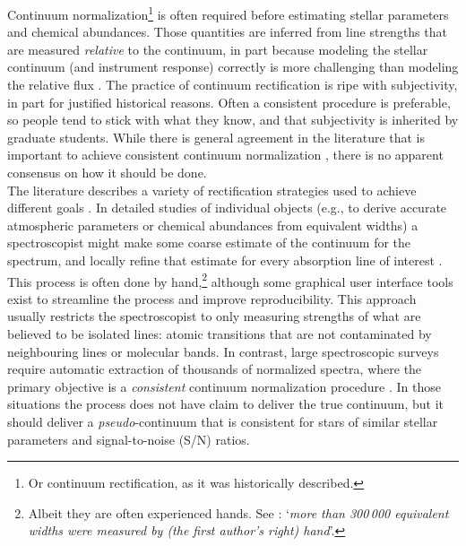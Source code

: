 \documentclass[modern,linenumbers]{aastex631}
\renewcommand{\added}[1]{#1}
\newcommand{\removed}[1]{}
\begin{document}
Continuum normalization\footnote{Or continuum rectification, as it was historically described.} is often required before estimating stellar parameters and chemical abundances. Those quantities are inferred from line strengths that are measured \emph{relative} to the continuum, in part because modeling the stellar continuum (and instrument response) correctly is more challenging than modeling the relative flux \citep[e.g.,][]{Wheeler:2023, Wheeler:2024}.
The practice of continuum rectification is ripe with subjectivity, in part for justified historical reasons. Often a consistent procedure is preferable, so people tend to stick with what they know, and that subjectivity is inherited by graduate students. While there is general agreement in the literature that is important to achieve consistent continuum normalization \citep{Blanco-Cuaresma:2014}, there is no apparent consensus on how it should be done.\\

The literature describes a variety of rectification strategies used to achieve different goals \citep{Ness:2015, Casey:2016, Xu:2019, Cretignier:2020}. \added{In detailed studies of individual objects (e.g., to derive accurate atmospheric parameters or chemical abundances from equivalent widths) a} \removed{Classical} spectroscopist might make some coarse estimate of the continuum for the spectrum, and locally refine that estimate for every absorption line of interest \citep[e.g.,][]{Casey:2014}. This process is often done by hand,\footnote{Albeit they are often experienced hands. See \citet{Bensby:2014}: `\emph{more than 300\,000 equivalent widths were measured by (the first author's right) hand}'.} although some graphical user interface tools exist to streamline the process and improve reproducibility. This approach usually restricts the spectroscopist to only measuring strengths of what are believed to be isolated lines: atomic transitions that are not contaminated by neighbouring lines or molecular bands. In contrast, \added{large spectroscopic surveys require automatic extraction of thousands of normalized spectra, where the primary objective is a} \removed{industrial spectroscopists often have a different objective: one where they solely for a} \emph{consistent} continuum normalization procedure \citep[e.g.,][]{Ness:2015, Casey:2016}. In those situations the process does not have claim to deliver the true continuum, but it should deliver a \emph{pseudo}-continuum that is consistent for stars of similar stellar parameters and signal-to-noise (S/N) ratios.\\
\end{document}
